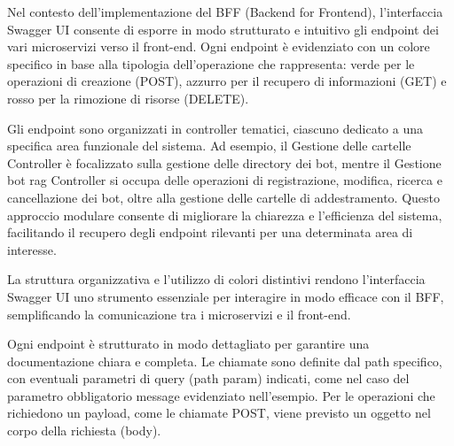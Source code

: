 \documentclass[a4paper,twoside,12pt]{toptesi}
\begin{document}
Nel contesto dell’implementazione del BFF (Backend for Frontend), l’interfaccia Swagger UI consente di esporre in modo strutturato e intuitivo gli endpoint dei vari microservizi verso il front-end. Ogni endpoint è evidenziato con un colore specifico in base alla tipologia dell’operazione che rappresenta: verde per le operazioni di creazione (POST), azzurro per il recupero di informazioni (GET) e rosso per la rimozione di risorse (DELETE).

Gli endpoint sono organizzati in controller tematici, ciascuno dedicato a una specifica area funzionale del sistema. Ad esempio, il Gestione delle cartelle Controller è focalizzato sulla gestione delle directory dei bot, mentre il Gestione bot rag Controller si occupa delle operazioni di registrazione, modifica, ricerca e cancellazione dei bot, oltre alla gestione delle cartelle di addestramento. Questo approccio modulare consente di migliorare la chiarezza e l’efficienza del sistema, facilitando il recupero degli endpoint rilevanti per una determinata area di interesse.

La struttura organizzativa e l’utilizzo di colori distintivi rendono l’interfaccia Swagger UI uno strumento essenziale per interagire in modo efficace con il BFF, semplificando la comunicazione tra i microservizi e il front-end.


Ogni endpoint è strutturato in modo dettagliato per garantire una documentazione chiara e completa. Le chiamate sono definite dal path specifico, con eventuali parametri di query (path param) indicati, come nel caso del parametro obbligatorio message evidenziato nell'esempio. Per le operazioni che richiedono un payload, come le chiamate POST, viene previsto un oggetto nel corpo della richiesta (body).
\end{document}
